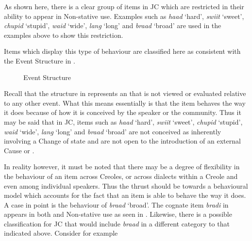 \z
 \z

As shown here, there is a clear group of items in JC which are restricted in their ability to appear in Non-stative use. Examples such as \textit{haad} `hard', \textit{swiit} `sweet', \textit{chupid} `stupid', \textit{waid} `wide', \textit{lang} `long' and \textit{braad} `broad' are used in the examples above to show this restriction.

Items which display this type of behaviour are classified here as  consistent with the Event Structure in .

\begin{figure}\caption{ Event Structure \citep[56]{Pustejovsky1991}\label{ex:5:18}}
\fbox{\parbox{3cm}{\centering
\begin{forest} [S [e]] \end{forest}}}
\end{figure}
 
Recall that the structure in  represents an  that is not viewed or evaluated relative to any other event. What this means essentially is that the item behaves the way it does because of how it is conceived by the speaker or the community. Thus it may be said that in JC, items such as \textit{haad} `hard', \textit{swiit} `sweet', \textit{chupid} `stupid', \textit{waid}  `wide’, \textit{lang} `long' and \textit{braad} `broad' are not conceived as inherently involving a Change of state and are not open to the introduction of an external Cause or . 

In reality however, it must be noted that there may be a degree of flexibility in the behaviour of an item across Creoles, or across dialects within a Creole and even among individual speakers. Thus the thrust should be towards a behavioural model which accounts for the fact that an item is able to behave the way it does. A case in point is the behaviour of \textit{braad} ‘broad’. The cognate item \textit{bradi} in  appears in both  and Non-stative use as seen in . Likewise, there is a possible classification for JC that would include \textit{braad} in a different category to that indicated above. Consider  for example\largerpage

